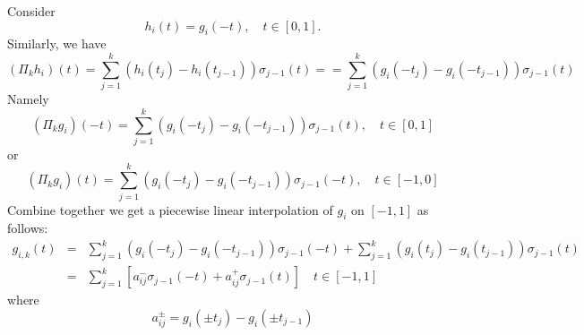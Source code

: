 Consider
\begin{equation}
h_i(t) = g_i(-t), \quad t\in [0,1].
\end{equation}
Similarly, we have
$$
(\Pi_kh_i)(t)=\sum_{j=1}^{k}(h_i(t_j) - h_i(t_{j-1}))\sigma_{j-1}(t)=
=\sum_{j=1}^{k}(g_i(-t_j) - g_i(-t_{j-1}))\sigma_{j-1}(t)
$$
Namely
$$
(\Pi_k g_i)(-t)=\sum_{j=1}^{k}(g_i(-t_j) - g_i(-t_{j-1}))\sigma_{j-1}(t), \quad t\in [0,1]
$$
or
\begin{equation}\label{gi1}
(\Pi_k g_i)(t)=\sum_{j=1}^{k}(g_i(-t_j) - g_i(-t_{j-1}))\sigma_{j-1}(-t), \quad t\in [-1,0]
\end{equation}
Combine together we get a piecewise linear
interpolation of $g_i$ on $[-1,1]$ as follows:
\begin{eqnarray}
g_{i,k}(t)&=&
\sum_{j=1}^{k}(g_i(-t_j) - g_i(-t_{j-1}))\sigma_{j-1}(-t)+\sum_{j=1}^{k}(g_i(t_j) - g_i(t_{j-1}))\sigma_{j-1}(t)\nonumber \\ 
&=&\sum_{j=1}^{k}[a_{ij}^-\sigma_{j-1}(-t)+a_{ij}^+\sigma_{j-1}(t)] \label{gih}
\quad t\in [-1,1]
\end{eqnarray}
where 
$$
a_{ij}^{\pm}=g_i(\pm t_j) - g_i(\pm t_{j-1})
$$
%


